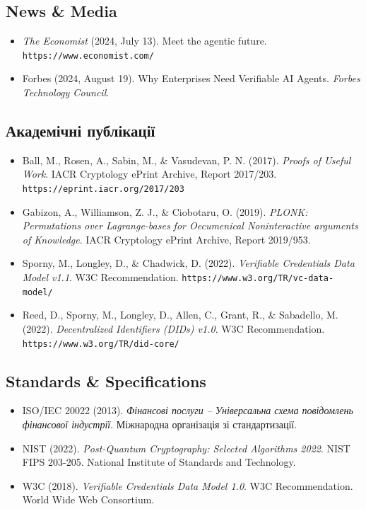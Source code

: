 \documentclass[11pt]{article}
\begin{document}
\subsection*{News \& Media}

\begin{itemize}[leftmargin=*, label={}]
  \item \textit{The Economist} (2024, July 13). Meet the agentic future. \texttt{https://www.economist.com/}

  \item Forbes (2024, August 19). Why Enterprises Need Verifiable AI Agents. \textit{Forbes Technology Council}.
\end{itemize}

\subsection*{Академічні публікації}

\begin{itemize}[leftmargin=*, label={}]
  \item Ball, M., Rosen, A., Sabin, M., \& Vasudevan, P. N. (2017). \textit{Proofs of Useful Work}. IACR Cryptology ePrint Archive, Report 2017/203. \texttt{https://eprint.iacr.org/2017/203}

  \item Gabizon, A., Williamson, Z. J., \& Ciobotaru, O. (2019). \textit{PLONK: Permutations over Lagrange-bases for Oecumenical Noninteractive arguments of Knowledge}. IACR Cryptology ePrint Archive, Report 2019/953.

  \item Sporny, M., Longley, D., \& Chadwick, D. (2022). \textit{Verifiable Credentials Data Model v1.1}. W3C Recommendation. \texttt{https://www.w3.org/TR/vc-data-model/}

  \item Reed, D., Sporny, M., Longley, D., Allen, C., Grant, R., \& Sabadello, M. (2022). \textit{Decentralized Identifiers (DIDs) v1.0}. W3C Recommendation. \texttt{https://www.w3.org/TR/did-core/}
\end{itemize}

\subsection*{Standards \& Specifications}

\begin{itemize}[leftmargin=*, label={}]
  \item ISO/IEC 20022 (2013). \textit{Фінансові послуги -- Універсальна схема повідомлень фінансової індустрії}. Міжнародна організація зі стандартизації.

  \item NIST (2022). \textit{Post-Quantum Cryptography: Selected Algorithms 2022}. NIST FIPS 203-205. National Institute of Standards and Technology.

  \item W3C (2018). \textit{Verifiable Credentials Data Model 1.0}. W3C Recommendation. World Wide Web Consortium.
\end{itemize}
\end{document}

